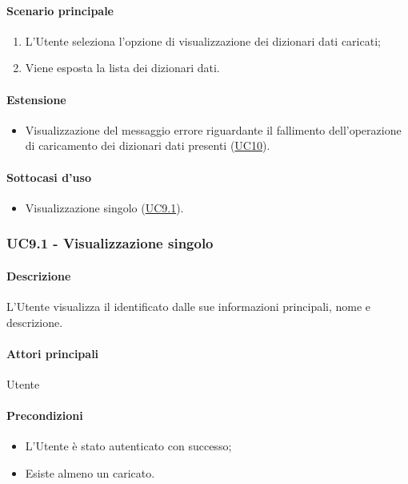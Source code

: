 \paragraph*{Scenario principale}
\begin{enumerate}
  \item L’Utente seleziona l’opzione di visualizzazione dei dizionari dati caricati;
  \item Viene esposta la lista dei dizionari dati.  
\end{enumerate}

\paragraph*{Estensione}
\begin{itemize}
  \item Visualizzazione del messaggio errore riguardante il fallimento dell’operazione di caricamento dei dizionari dati presenti (\hyperref[UC10]{UC10}).
\end{itemize}

\paragraph*{Sottocasi d'uso}
\begin{itemize}
  \item Visualizzazione singolo  (\hyperref[UC9point1]{UC9.1}).
\end{itemize}

\subsubsection{UC9.1 - Visualizzazione singolo }\label{UC9point1}
\paragraph*{Descrizione}
L’Utente visualizza il  identificato dalle sue informazioni principali, nome e descrizione.
\paragraph*{Attori principali} Utente
\paragraph*{Precondizioni}
\begin{itemize}
  \item L’Utente è stato autenticato con successo;
  \item Esiste almeno un  caricato.  
\end{itemize}
